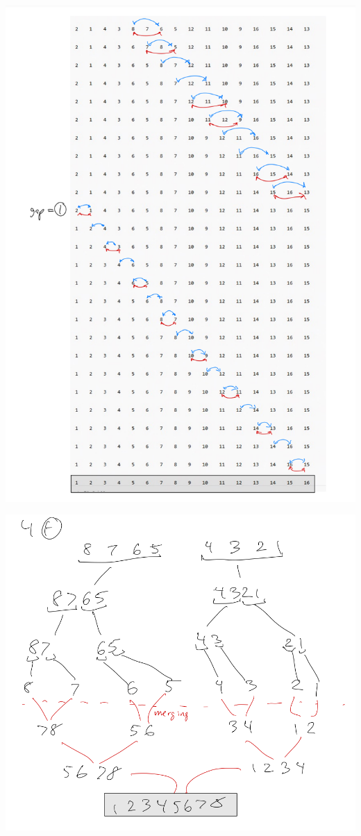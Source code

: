 \documentclass[11pt,largemargins]{homework}
\begin{document}
\begin{alphaparts}
  \includegraphics[width=1\textwidth]{hw1drawings/4e2.png}

  \newpage
  \questionpart

  \includegraphics[width=1\textwidth]{hw1drawings/4f.png}


\end{alphaparts}
\end{document}
